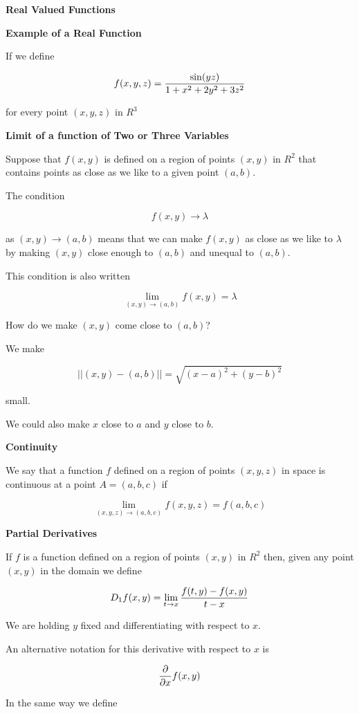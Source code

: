 \filbreak
\vskip 1cm
{\bf Real Valued Functions}

\vskip 1mm
{\bf Example of a Real Function}

\vskip 1mm
If we define

$$f(x,y,z)={\sin(yz)\over 1+x^2+2y^2+3z^2}$$

for every point $(x,y,z)$ in $R^3$

\filbreak
\vskip 1cm
{\bf Limit of a function of Two or Three Variables}

\vskip 1mm
Suppose that $f(x,y)$ is defined on a region of points $(x,y)$ in $R^2$ that contains points as close as we like to a given point $(a,b)$.

\vskip 1mm
The condition

$$f(x,y)\to\lambda$$

as $(x,y)\to(a,b)$ means that we can make $f(x,y)$ as close as we like to $\lambda$ by making $(x,y)$ close enough to $(a,b)$ and unequal to $(a,b)$.

\vskip 1mm
This condition is also written

$$\lim_{(x,y)\to (a,b)}f(x,y)=\lambda$$

How do we make $(x,y)$ come close to $(a,b)$?

\vskip 1mm
We make

$$||(x,y)-(a,b)||=\sqrt{(x-a)^2+(y-b)^2}$$

small.

\vskip 1mm
We could also make $x$ close to $a$ and $y$ close to $b$.

\filbreak
\vskip 1cm
{\bf Continuity}

\vskip 1mm
We say that a function $f$ defined on a region of points $(x,y,z)$ in space is continuous at a point $A=(a,b,c)$ if

$$\lim_{(x,y,z)\to(a,b,c)}f(x,y,z)=f(a,b,c)$$

\filbreak
\vskip 1cm
{\bf Partial Derivatives}

\vskip 1mm
If $f$ is a function defined on a region of points $(x,y)$ in $R^2$ then, given any point $(x,y)$ in the domain we define

$$D_1f(x,y)=\lim_{t\to x}{f(t,y)-f(x,y)\over t-x}$$

We are holding $y$ fixed and differentiating with respect to $x$.

\vskip 1mm
An alternative notation for this derivative with respect to $x$ is

$${\partial\over\partial x}f(x,y)$$

In the same way we define

